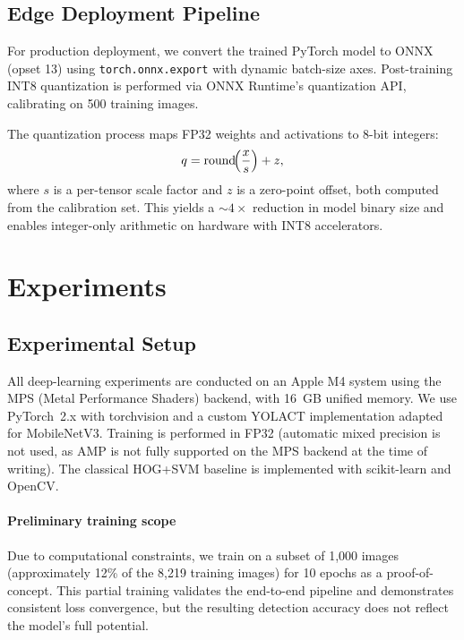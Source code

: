 \documentclass[conference]{IEEEtran}
\begin{document}
\subsection{Edge Deployment Pipeline}
\label{sec:edge}

For production deployment, we convert the trained PyTorch model to ONNX
(opset 13) using \texttt{torch.onnx.export} with dynamic batch-size axes.
Post-training INT8 quantization is performed via ONNX Runtime's
quantization API, calibrating on 500 training images.

The quantization process maps FP32 weights and activations to 8-bit
integers:
\begin{equation}
  q = \text{round}\!\Bigl(\frac{x}{s}\Bigr) + z,
  \label{eq:quant}
\end{equation}
where $s$ is a per-tensor scale factor and $z$ is a zero-point offset,
both computed from the calibration set. This yields a ${\sim}4\times$
reduction in model binary size and enables integer-only arithmetic on
hardware with INT8 accelerators.

\section{Experiments}
\label{sec:experiments}

\subsection{Experimental Setup}
\label{sec:setup}

All deep-learning experiments are conducted on an Apple M4 system using
the MPS (Metal Performance Shaders) backend, with 16~GB unified memory.
We use PyTorch~2.x with torchvision and a custom YOLACT implementation
adapted for MobileNetV3. Training is performed in FP32 (automatic mixed
precision is not used, as AMP is not fully supported on the MPS backend
at the time of writing). The classical HOG+SVM baseline is implemented
with scikit-learn and OpenCV.

\paragraph{Preliminary training scope}
Due to computational constraints, we train on a subset of 1{,}000 images
(approximately 12\% of the 8{,}219 training images) for 10 epochs as a
proof-of-concept. This partial training validates the end-to-end pipeline
and demonstrates consistent loss convergence, but the resulting detection
accuracy does not reflect the model's full potential.
\end{document}
